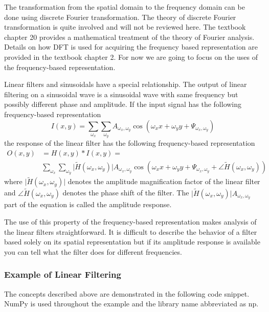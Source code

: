 \documentclass[]{article}
\begin{document}
The transformation from the spatial domain to the frequency domain can be done
using discrete Fourier transformation. The theory of discrete Fourier
transformation is quite involved and will not be reviewed here. The textbook
chapter 20 provides a mathematical treatment of the theory of Fourier analysis.
Details on how DFT is used for acquiring the frequency based representation are
provided in the textbook chapter 2. For now we are going to focus on the uses of
the frequency-based representation.

Linear filters and sinusoidals have a special relationship. The output of
linear filtering on a sinusoidal wave is a sinusoidal wave with same frequency
but possibly different phase and amplitude. If the input signal has the
following frequency-based representation
\begin{equation}
  I(x,y) = \sum_{\omega_{x}}{\sum_{\omega_{y}}{A_{\omega_{x},\omega_{y}}\cos(\omega_{x}x+\omega_{y}y+\Psi_{\omega_{x},\omega_{y}})}}
\end{equation}
the response of the linear filter has the following frequency-based representation
\begin{equation}
  \begin{split}
    O(x,y) & = H(x,y) \ast I(x,y) = \\
           & \sum_{\omega_{x}}{\sum_{\omega_{y}}{\lvert \tilde{H}(\omega_{x},\omega_{y})\rvert A_{\omega_{x},\omega_{y}} \cos(\omega_{x} x + \omega_{y} y + \Psi_{\omega_{x},\omega_{y}} + \angle\tilde{H}(\omega_{x},\omega_{y}))}}
  \end{split}
\end{equation}
where $\lvert\tilde{H}(\omega_{x},\omega_{y})\rvert$ denotes the amplitude
magnification factor of the linear filter and
$\angle\tilde{H}(\omega_{x},\omega_{y})$ denotes the phase shift of the filter.
The $\lvert\tilde{H}(\omega_{x},\omega_{y})\rvert A_{\omega_{x},\omega_{y}}$
part of the equation is called the amplitude response.

The use of this property of the frequency-based representation makes analysis of
the linear filters straightforward. It is difficult to describe the behavior of
a filter based solely on its spatial representation but if its amplitude
response is available you can tell what the filter does for different
frequencies.

\subsubsection{Example of Linear Filtering}
\label{example-of-linear-filtering}
The concepts described above are demonstrated in the following code snippet.
NumPy is used throughout the example and the library name abbreviated as np.
\end{document}
